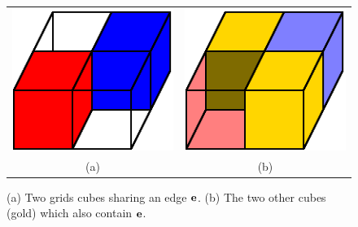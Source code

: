 \begin{figure}[t]
\centering

\begin{tabular}{cc}
\includegraphics[width=0.4\linewidth]{images/shared_edge.eps} \qquad &
\qquad
\includegraphics[width=0.4\linewidth]{images/shared_edge_B.eps} \\
(a) & (b)
\end{tabular}

\caption{(a) Two grids cubes sharing an edge $\mathbf{e}$.
(b) The two other cubes (gold) which also contain $\mathbf{e}$.
}
\label{fig:shared_edge}
\end{figure}

